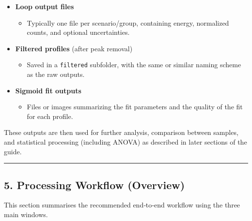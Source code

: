 \begin{itemize}
\tightlist
\item
  \textbf{Loop output files}

  \begin{itemize}
  \tightlist
  \item
    Typically one file per scenario/group, containing energy, normalized
    counts, and optional uncertainties.
  \end{itemize}
\item
  \textbf{Filtered profiles} (after peak removal)

  \begin{itemize}
  \tightlist
  \item
    Saved in a \texttt{filtered} subfolder, with the same or similar
    naming scheme as the raw outputs.
  \end{itemize}
\item
  \textbf{Sigmoid fit outputs}

  \begin{itemize}
  \tightlist
  \item
    Files or images summarizing the fit parameters and the quality of
    the fit for each profile.
  \end{itemize}
\end{itemize}

These outputs are then used for further analysis, comparison between
samples, and statistical processing (including ANOVA) as described in
later sections of the guide.

\begin{center}\rule{0.5\linewidth}{0.5pt}\end{center}

\hypertarget{processing-workflow-overview}{%
\subsection{5. Processing Workflow
(Overview)}\label{processing-workflow-overview}}

This section summarises the recommended end‑to‑end workflow using the
three main windows.

